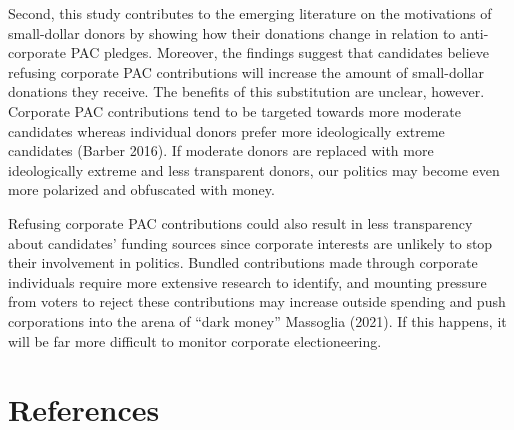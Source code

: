 \documentclass[
  12pt,
]{article}
\begin{document}
Second, this study contributes to the emerging literature on the motivations of small-dollar donors by showing how their donations change in relation to anti-corporate PAC pledges. Moreover, the findings suggest that candidates believe refusing corporate PAC contributions will increase the amount of small-dollar donations they receive. The benefits of this substitution are unclear, however. Corporate PAC contributions tend to be targeted towards more moderate candidates whereas individual donors prefer more ideologically extreme candidates (Barber 2016). If moderate donors are replaced with more ideologically extreme and less transparent donors, our politics may become even more polarized and obfuscated with money.

Refusing corporate PAC contributions could also result in less transparency about candidates' funding sources since corporate interests are unlikely to stop their involvement in politics. Bundled contributions made through corporate individuals require more extensive research to identify, and mounting pressure from voters to reject these contributions may increase outside spending and push corporations into the arena of ``dark money'' Massoglia (2021). If this happens, it will be far more difficult to monitor corporate electioneering.

\hypertarget{references}{%
\section{References}\label{references}}
\end{document}
